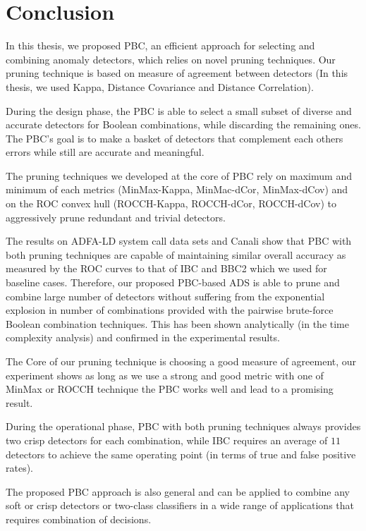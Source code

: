 \chapter{Conclusion} \label{chapter5}
In this thesis, we proposed PBC, an efficient approach for selecting and combining anomaly detectors, which relies on novel pruning techniques. Our pruning technique is based on measure of agreement between detectors (In this thesis, we used Kappa, Distance Covariance and Distance Correlation).

During the design phase, the PBC is able to select a small subset of diverse and accurate detectors for Boolean combinations, while discarding the remaining ones. The PBC's goal is to make a basket of detectors that complement each others errors while still are accurate and meaningful.

The pruning techniques we developed at the core of PBC rely on maximum and minimum of each metrics (MinMax-Kappa, MinMac-dCor, MinMax-dCov) and on the ROC convex hull (ROCCH-Kappa, ROCCH-dCor, ROCCH-dCov) to aggressively prune redundant and trivial detectors.

The results on ADFA-LD system call data sets and Canali show that PBC with both pruning techniques are capable of maintaining similar overall accuracy as measured by the ROC curves to that of IBC and BBC2 which we used for baseline cases.
Therefore, our proposed PBC-based ADS is able to prune and combine large number of detectors without suffering from the exponential explosion in number of combinations provided with the pairwise brute-force Boolean combination techniques.
This has been shown analytically (in the time complexity analysis) and confirmed in the experimental results.

The Core of our pruning technique is choosing a good measure of agreement, our experiment shows as long as we use a strong and good metric with one of MinMax or ROCCH technique the PBC works well and lead to a promising result.

During the operational phase, PBC with both pruning techniques always provides two crisp detectors for each combination, while IBC requires an average of $11$ detectors to achieve the same operating point (in terms of true and false positive rates).


The proposed PBC approach is also general and can be applied to combine any soft or crisp detectors or two-class classifiers in a wide range of applications that requires combination of decisions.



